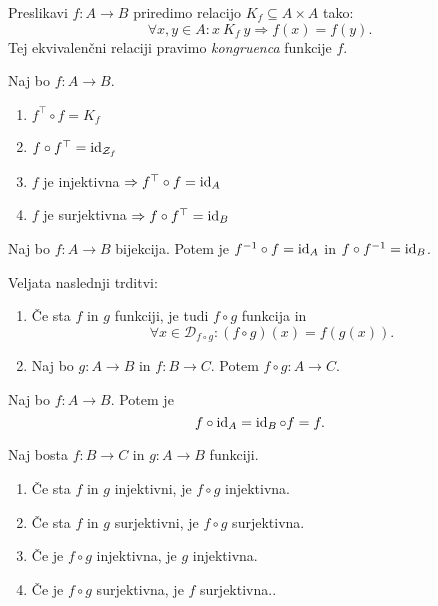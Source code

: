 \documentclass[12pt, a4paper]{article}
\renewcommand{\implies}{\Rightarrow}
\begin{document}
\begin{definicija}
Preslikavi $f\colon A\to B$ priredimo relacijo $K_f\subseteq A\times A$ tako:
\[
\forall x,y\in A\colon x~K_f~y\implies f(x)=f(y).
\]
Tej ekvivalenčni relaciji pravimo \emph{kongruenca} funkcije $f$.
\end{definicija}

\begin{trditev}
Naj bo $f\colon A\to B$.

\begin{enumerate}
\item $f^\top\circ f=K_f$
\item $f\circ f^\top=\operatorname{id}_{\mathcal{Z}_f}$
\item $f$ je injektivna $\implies f^\top\circ f=\id_A$
\item $f$ je surjektivna $\implies f\circ f^\top=\id_B$
\end{enumerate}
\end{trditev}

\obvs

\begin{posledica}
Naj bo $f\colon A\to B$ bijekcija. Potem je $f^{-1}\circ f=\operatorname{id}_A$ in $f\circ f^{-1}=\operatorname{id}_B$.
\end{posledica}

\begin{izrek}
Veljata naslednji trditvi:

\begin{enumerate}
\item Če sta $f$ in $g$ funkciji, je tudi $f\circ g$ funkcija in
\[
\forall x\in\mathcal{D}_{f\circ g}\colon (f\circ g)(x)=f(g(x)).
\]
\item Naj bo $g\colon A\to B$ in $f\colon B\to C$. Potem $f\circ g\colon A\to C$.
\end{enumerate}
\end{izrek}

\obvs

\begin{trditev}
Naj bo $f\colon A\to B$. Potem je
\[
f\circ\operatorname{id}_A=\operatorname{id}_B\circ f=f.
\]
\end{trditev}

\begin{trditev}
Naj bosta $f\colon B\to C$ in $g\colon A\to B$ funkciji.

\begin{enumerate}
\item Če sta $f$ in $g$ injektivni, je $f\circ g$ injektivna.
\item Če sta $f$ in $g$ surjektivni, je $f\circ g$ surjektivna.
\item Če je $f\circ g$ injektivna, je $g$ injektivna.
\item Če je $f\circ g$ surjektivna, je $f$ surjektivna..
\end{enumerate}
\end{trditev}
\end{document}
